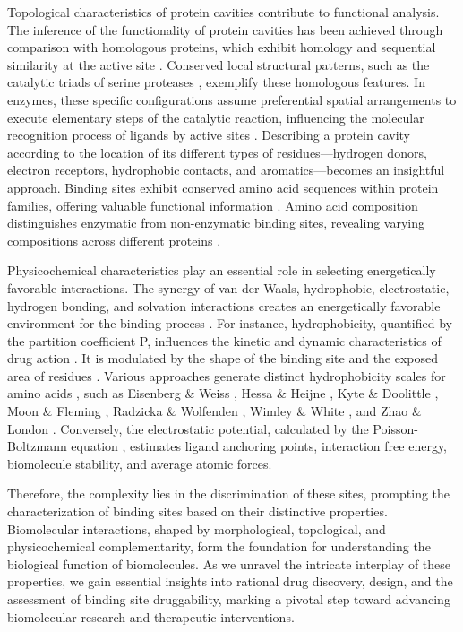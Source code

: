 \documentclass[Ingles]{phdthesis}
\begin{document}
Topological characteristics of protein cavities contribute to functional analysis. The inference of the functionality of protein cavities has been achieved through comparison with homologous proteins, which exhibit homology and sequential similarity at the active site \cite{juncker2009}. Conserved local structural patterns, such as the catalytic triads of serine proteases \cite{dodson1998}, exemplify these homologous features. In enzymes, these specific configurations assume preferential spatial arrangements to execute elementary steps of the catalytic reaction, influencing the molecular recognition process of ligands by active sites \cite{sotriffer2002,henrich2010,thornton2000}. Describing a protein cavity according to the location of its different types of residues---hydrogen donors, electron receptors, hydrophobic contacts, and aromatics---becomes an insightful approach. Binding sites exhibit conserved amino acid sequences within protein families, offering valuable functional information \cite{henrich2010}. Amino acid composition distinguishes enzymatic from non-enzymatic binding sites, revealing varying compositions across different proteins \cite{guerra2019,carlson2008}.

Physicochemical characteristics play an essential role in selecting energetically favorable interactions. The synergy of van der Waals, hydrophobic, electrostatic, hydrogen bonding, and solvation interactions creates an energetically favorable environment for the binding process \cite{henrich2010}. For instance, hydrophobicity, quantified by the partition coefficient P, influences the kinetic and dynamic characteristics of drug action \cite{mannhold2009}. It is modulated by the shape of the binding site and the exposed area of residues \cite{henrich2010}. Various approaches generate distinct hydrophobicity scales for amino acids \cite{heiden1993}, such as Eisenberg \& Weiss \cite{eisenberg1984}, Hessa \& Heijne \cite{hessa2005}, Kyte \& Doolittle \cite{kyte1982}, Moon \& Fleming \cite{moon2011}, Radzicka \& Wolfenden \cite{radzicka1988}, Wimley \& White \cite{wimley1996}, and Zhao \& London \cite{zhao2006}. Conversely, the electrostatic potential, calculated by the Poisson-Boltzmann equation \cite{honig1995}, estimates ligand anchoring points, interaction free energy, biomolecule stability, and average atomic forces.

Therefore, the complexity lies in the discrimination of these sites, prompting the characterization of binding sites based on their distinctive properties. Biomolecular interactions, shaped by morphological, topological, and physicochemical complementarity, form the foundation for understanding the biological function of biomolecules. As we unravel the intricate interplay of these properties, we gain essential insights into rational drug discovery, design, and the assessment of binding site druggability, marking a pivotal step toward advancing biomolecular research and therapeutic interventions.
\end{document}
